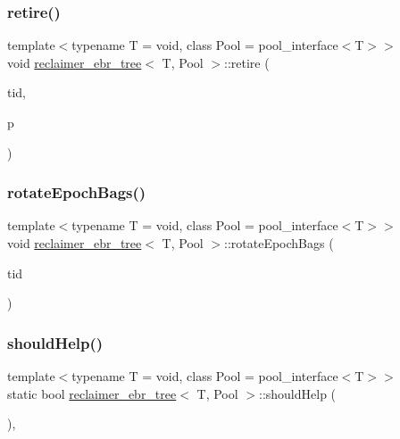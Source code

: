 \subsubsection{\texorpdfstring{retire()}{retire()}}
{\footnotesize\ttfamily template$<$typename T  = void, class Pool  = pool\+\_\+interface$<$\+T$>$$>$ \\
void \hyperlink{classreclaimer__ebr__tree}{reclaimer\+\_\+ebr\+\_\+tree}$<$ T, Pool $>$\+::retire (\begin{DoxyParamCaption}\item[{const int}]{tid,  }\item[{T $\ast$}]{p }\end{DoxyParamCaption})\hspace{0.3cm}{\ttfamily [inline]}}

\mbox{\label{classreclaimer__ebr__tree_ad9653eeebe33675cae7f754026296e49}} 
\subsubsection{\texorpdfstring{rotate\+Epoch\+Bags()}{rotateEpochBags()}}
{\footnotesize\ttfamily template$<$typename T  = void, class Pool  = pool\+\_\+interface$<$\+T$>$$>$ \\
void \hyperlink{classreclaimer__ebr__tree}{reclaimer\+\_\+ebr\+\_\+tree}$<$ T, Pool $>$\+::rotate\+Epoch\+Bags (\begin{DoxyParamCaption}\item[{const int}]{tid }\end{DoxyParamCaption})\hspace{0.3cm}{\ttfamily [inline]}}

\mbox{\label{classreclaimer__ebr__tree_a3d2a44d772dd6fdcca0f593b01b20287}} 
\subsubsection{\texorpdfstring{should\+Help()}{shouldHelp()}}
{\footnotesize\ttfamily template$<$typename T  = void, class Pool  = pool\+\_\+interface$<$\+T$>$$>$ \\
static bool \hyperlink{classreclaimer__ebr__tree}{reclaimer\+\_\+ebr\+\_\+tree}$<$ T, Pool $>$\+::should\+Help (\begin{DoxyParamCaption}{ }\end{DoxyParamCaption})\hspace{0.3cm}{\ttfamily [inline]}, {\ttfamily [static]}}

